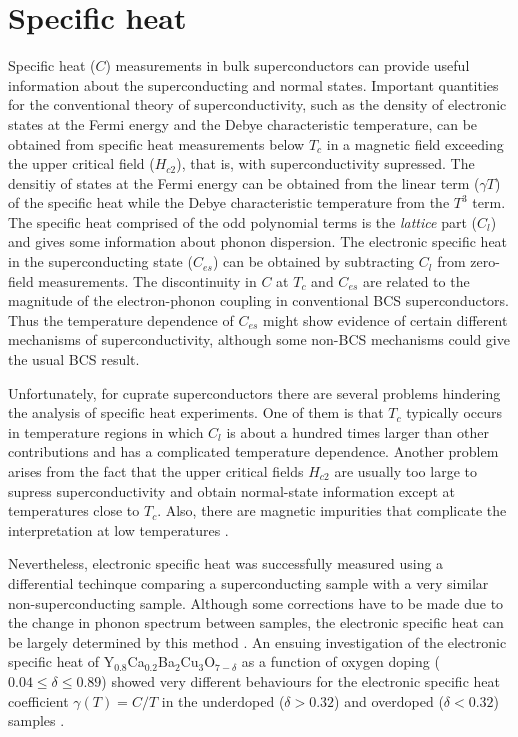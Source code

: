 \section{Specific heat}
\label{sec:specific_heat}

Specific heat ($C$) measurements in bulk superconductors can provide useful information about the superconducting and normal states.
Important quantities for the conventional theory of superconductivity, such as the density of electronic states at the Fermi energy and the Debye characteristic temperature, can be obtained from specific heat measurements below $T_c$ in a magnetic field exceeding the upper critical field ($H_{c2}$), that is, with superconductivity supressed.
The densitiy of states at the Fermi energy can be obtained from the linear term ($\gamma T$) of the specific heat while the Debye characteristic temperature from the $T^3$ term.
The specific heat comprised of the odd polynomial terms is the \textit{lattice} part ($C_l$) and gives some information about phonon dispersion. 
The electronic specific heat in the superconducting state  ($C_{es}$) can be obtained by subtracting $C_l$ from zero-field measurements.
The discontinuity in $C$ at $T_c$ and $C_{es}$ are related to the magnitude of the electron-phonon coupling in conventional BCS superconductors.
Thus the temperature dependence of $C_{es}$ might show evidence of certain different mechanisms of superconductivity, although some non-BCS mechanisms could give the usual BCS result.

Unfortunately, for cuprate superconductors there are several problems hindering the analysis of specific heat experiments.
One of them is that $T_c$ typically occurs in temperature regions in which $C_l$ is about a hundred times larger than other contributions and has a complicated temperature dependence.
Another problem arises from the fact that the upper critical fields $H_{c2}$ are usually too large to supress superconductivity and obtain normal-state information except at temperatures close to $T_c$.
Also, there are magnetic impurities that complicate the interpretation at low temperatures \cite{Fisher1988}.

Nevertheless, electronic specific heat was successfully measured using a differential techinque comparing a superconducting sample with a very similar non-superconducting sample. 
Although some corrections have to be made due to the change in phonon spectrum between samples, the electronic specific heat can be largely determined by this method \cite{Loram1990,Loram1993, Loram1994}.
An ensuing investigation of the electronic specific heat of Y$_{0.8}$Ca$_{0.2}$Ba$_2$Cu$_3$O$_{7-\delta}$ as a function of oxygen doping ($0.04\leq \delta \leq 0.89$) showed very different behaviours for the electronic specific heat coefficient $\gamma (T) = C/T$ in the underdoped ($\delta > 0.32$) and overdoped ($\delta < 0.32$) samples \cite{Loram1997}.

